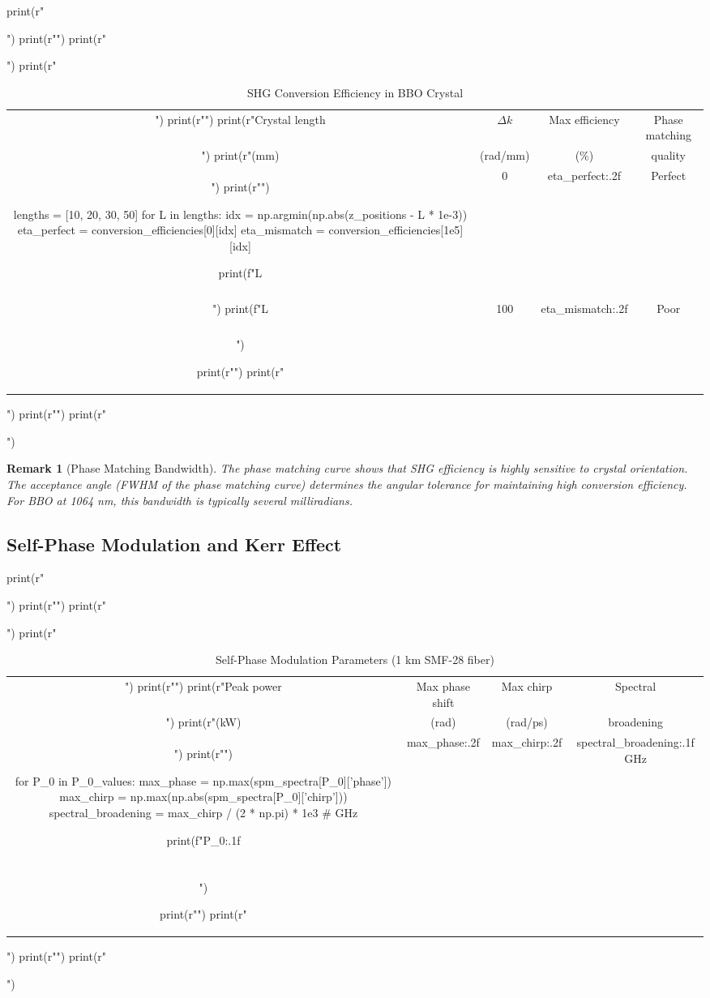 \documentclass[a4paper, 11pt]{article}
\newtheorem{remark}{Remark}[section]
\begin{document}
\begin{pycode}
print(r"\begin{table}[htbp]")
print(r"\centering")
print(r"\caption{SHG Conversion Efficiency in BBO Crystal}")
print(r"\begin{tabular}{cccc}")
print(r"\toprule")
print(r"Crystal length & $\Delta k$ & Max efficiency & Phase matching \\")
print(r"(mm) & (rad/mm) & (\%) & quality \\")
print(r"\midrule")

lengths = [10, 20, 30, 50]
for L in lengths:
    idx = np.argmin(np.abs(z_positions - L * 1e-3))
    eta_perfect = conversion_efficiencies[0][idx]
    eta_mismatch = conversion_efficiencies[1e5][idx]

    print(f"{L} & 0 & {eta_perfect:.2f} & Perfect \\\\")
    print(f"{L} & 100 & {eta_mismatch:.2f} & Poor \\\\")

print(r"\bottomrule")
print(r"\end{tabular}")
print(r"\label{tab:shg}")
print(r"\end{table}")
\end{pycode}

\begin{remark}[Phase Matching Bandwidth]
The phase matching curve shows that SHG efficiency is highly sensitive to crystal orientation.
The acceptance angle (FWHM of the phase matching curve) determines the angular tolerance for
maintaining high conversion efficiency. For BBO at 1064 nm, this bandwidth is typically
several milliradians.
\end{remark}

\subsection{Self-Phase Modulation and Kerr Effect}

\begin{pycode}
print(r"\begin{table}[htbp]")
print(r"\centering")
print(r"\caption{Self-Phase Modulation Parameters (1 km SMF-28 fiber)}")
print(r"\begin{tabular}{cccc}")
print(r"\toprule")
print(r"Peak power & Max phase shift & Max chirp & Spectral \\")
print(r"(kW) & (rad) & (rad/ps) & broadening \\")
print(r"\midrule")

for P_0 in P_0_values:
    max_phase = np.max(spm_spectra[P_0]['phase'])
    max_chirp = np.max(np.abs(spm_spectra[P_0]['chirp']))
    spectral_broadening = max_chirp / (2 * np.pi) * 1e3  # GHz

    print(f"{P_0:.1f} & {max_phase:.2f} & {max_chirp:.2f} & {spectral_broadening:.1f} GHz \\\\")

print(r"\bottomrule")
print(r"\end{tabular}")
print(r"\label{tab:spm}")
print(r"\end{table}")
\end{pycode}
\end{document}
